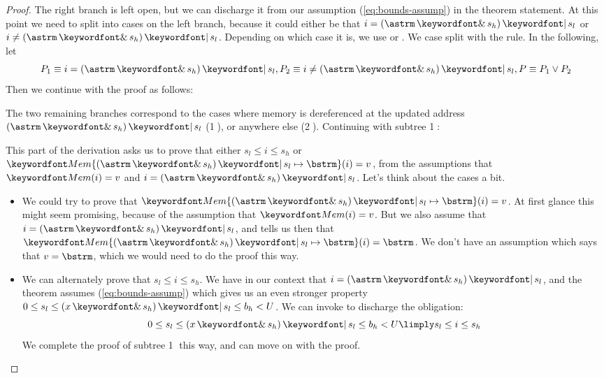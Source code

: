 \documentclass[11pt,twoside]{scrartcl}
\begin{document}
\begin{proof}
The right branch is left open, but we can discharge it from our assumption (\ref{eq:bounds-assump}) in the theorem statement.
At this point we need to split into cases on the left branch, because it could either be that $i = (\astrm \bitand s_h) \bitor s_l$ or $i \ne (\astrm \bitand s_h) \bitor s_l$. Depending on which case it is, we use  or . We case split with the  rule. In the following, let
\[
P_1 \equiv i = (\astrm \bitand s_h) \bitor s_l, P_2 \equiv i \ne(\astrm \bitand s_h) \bitor s_l, P \equiv P_1 \lor P_2
\]
Then we continue with the proof as follows:
\begin{sequentdeduction}
 {
}
\end{sequentdeduction}
The two remaining branches correspond to the cases where memory is dereferenced at the updated address $(\astrm \bitand s_h) \bitor s_l$ (\textcircled{1}), or anywhere else (\textcircled{2}).
Continuing with subtree \textcircled{1}:
\begin{sequentdeduction}
 {
}
\end{sequentdeduction}
This part of the derivation asks us to prove that either $s_l \le i \le s_h$ or $\memupd{\pderefop}{(\astrm \bitand s_h) \bitor s_l}{\bstrm}(i)=v$, from the assumptions that $\pderef{i}=v$ and $i = (\astrm \bitand s_h) \bitor s_l$. Let's think about the cases a bit.
\begin{itemize}
\item We could try to prove that $\memupd{\pderefop}{(\astrm \bitand s_h) \bitor s_l}{\bstrm}(i)=v$. At first glance this might seem promising, because of the assumption that $\pderef{i}=v$. But we also assume that $i = (\astrm \bitand s_h) \bitor s_l$, and  tells us then that $\memupd{\pderefop}{(\astrm \bitand s_h) \bitor s_l}{\bstrm}(i) = \bstrm$. We don't have an assumption which says that $v = \bstrm$, which we would need to do the proof this way.
\item We can alternately prove that $s_l \le i \le s_h$. We have in our context that $i = (\astrm \bitand s_h) \bitor s_l$, and the theorem assumes (\ref{eq:bounds-assump}) which gives us an even stronger property $0 \le s_l \le  (x \bitand s_h) \bitor s_l \le b_h < \maxmem$. We can invoke  to discharge the obligation:
\[
0 \le s_l \le  (x \bitand s_h) \bitor s_l \le b_h < \maxmem \limply s_l \le i \le s_h
\]
We complete the proof of subtree \textcircled{1} this way, and can move on with the proof.
\end{itemize}


\end{proof}
\end{document}
